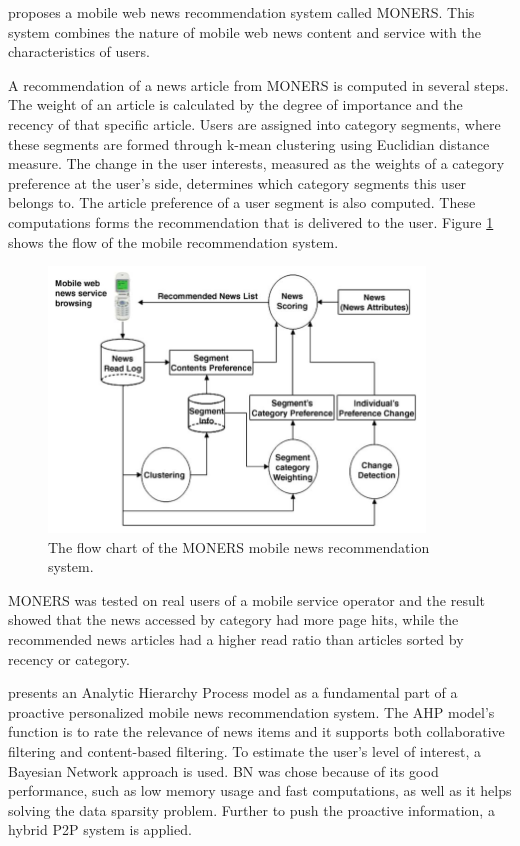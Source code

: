 \cite{lee2007moners} proposes a mobile web news recommendation system called MONERS. This system combines the nature of mobile web news content and service with the characteristics of users. 

A recommendation of a news article from MONERS is computed in several steps. The weight of an article is calculated by the degree of importance and the recency of that specific article. Users are assigned into category segments, where these segments are formed through k-mean clustering\cite{teknomo2006k} using Euclidian distance measure\cite{danielsson1980euclidean}. The change in the user interests, measured as the weights of a category preference at the user's side, determines which category segments this user belongs to. The article preference of a user segment is also computed. These computations forms the recommendation that is delivered to the user. Figure \ref{moners_flow_chart} shows the flow of the mobile recommendation system.

\begin{figure}[!htbp]
\centering
\includegraphics[width=100mm]{GFX/tech/monersFlowChart.png}
\caption{The flow chart of the MONERS mobile news recommendation system.}
\label{moners_flow_chart}
\end{figure}

MONERS was tested on real users of a mobile service operator and the result showed that the news accessed by category had more page hits, while the recommended news articles had a higher read ratio than articles sorted by recency or category.



\cite{yeung2010proactive} presents an Analytic Hierarchy Process\cite{saaty1988analytic} model as a fundamental part of a proactive personalized mobile news recommendation system. The AHP model's function is to rate the relevance of news items and it supports both collaborative filtering and content-based filtering. To estimate the user's level of interest, a Bayesian Network\cite{jensen1996introduction} approach is used. BN was chose because of its good performance, such as low memory usage and fast computations, as well as it helps solving the data sparsity problem. Further to push the proactive information, a hybrid P2P\cite{shen2010handbook} system is applied.

